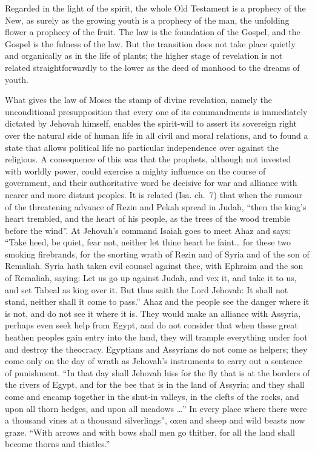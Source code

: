 \documentclass[12pt,a4paper,openany]{book}
\newcommand{\opage}[1]{\marginnote{\footnotesize\textit{[#1]}}}
\begin{document}
Regarded in the light of the spirit, the whole Old Testament
is a prophecy of the New, as surely as the growing
youth is a prophecy of the man, the unfolding
flower a prophecy of the fruit. The law is
the foundation of the Gospel, and the Gospel is the fulness of the law.
But the transition does not take place quietly and organically as in the life of plants;
the higher stage of revelation is not related
straightforwardly to the lower as the deed of manhood to the
dreams of youth.

What gives the law of Moses the stamp of divine
revelation, namely the unconditional presupposition that
every one of its commandments is immediately dictated by Jehovah
himself, enables the spirit-will to assert its sovereign right
over the natural side of human life in all civil and moral
relations, and to found a state that allows
political life no particular independence
over against the religious. A consequence of this was that the prophets,
although not invested with worldly power,
could exercise a mighty influence on the course of
government, and their authoritative word be decisive for war
and alliance with nearer and more distant peoples. It
is related (Isa. ch.~7) that when the rumour of the threatening advance of Rezin and Pekah
spread in Judah, ``then the
king's heart trembled, and the heart of his people, as the trees of
the wood tremble before the wind''. At Jehovah's command
Isaiah goes to meet Ahaz and says: ``Take heed, be
quiet, fear not, neither let thine heart be faint\dots{}
\setcounter{footnote}{0}%
\opage{47}for these two smoking firebrands, for the snorting wrath of Rezin and of Syria and of
the son of Remaliah. Syria hath taken evil
counsel against thee, with Ephraim and the son of Remaliah, saying:
Let us go up against Judah, and vex it, and take it to
us, and set Tabeal as king over it. But thus saith
the Lord Jehovah: It shall not stand, neither shall it
come to pass.'' Ahaz and the people see the danger where it is not,
and do not see it where it is. They would make
an alliance with Assyria, perhaps even seek help from
Egypt, and do not consider that when these great heathen peoples
gain entry into the land, they will trample everything under
foot and destroy the theocracy. Egyptians and Assyrians
do not come as helpers; they come only on the day of wrath
as Jehovah's instruments to carry out a sentence of punishment.
``In that day shall Jehovah hiss for the fly that
is at the borders of the rivers of Egypt, and for the bee that
is in the land of Assyria; and they shall come and encamp together
in the shut-in valleys, in the clefts of the rocks, and upon
all thorn hedges, and upon all meadows \dots{}'' In every
place where there were a thousand vines at a thousand silverlings'',
oxen and sheep and wild beasts now graze.
``With arrows and with bows shall men go thither, for
all the land shall become thorns and thistles.''
\end{document}
